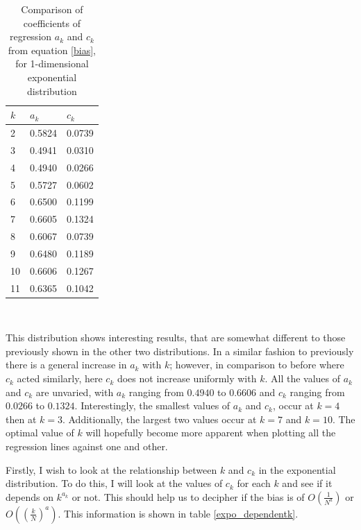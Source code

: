\documentclass[12pt]{report}
\begin{document}
\begin{table}
\caption{Comparison of coefficients of regression $a_{k}$ and $c_{k}$ from equation \ref{bias}, for 1-dimensional exponential distribution} \label{expo_a_c_compare_table}
\begin{center}
\begin{tabular}{| l | l l |} 
\toprule
$k$ &  $a_{k}$ & $c_{k}$ \\
\midrule[1pt]
2     & 0.5824    & 0.0739   \\
3     & 0.4941    & 0.0310   \\
4     & 0.4940    & 0.0266   \\
5     & 0.5727    & 0.0602   \\
6     & 0.6500    & 0.1199   \\
7     & 0.6605    & 0.1324   \\
8     & 0.6067    & 0.0739   \\
9     & 0.6480    & 0.1189   \\
10    & 0.6606    & 0.1267   \\
11    & 0.6365    & 0.1042   \\
\hline
\end{tabular}
\\[10pt]
\end{center}
\end{table}

This distribution shows interesting results, that are somewhat different to those previously shown in the other two distributions. In a similar fashion to previously there is a general increase in $a_{k}$ with $k$; however, in comparison to before where $c_{k}$ acted similarly, here $c_{k}$ does not increase uniformly with $k$. All the values of $a_{k}$ and $c_{k}$ are unvaried, with $a_{k}$ ranging from $0.4940$ to $0.6606$ and $c_{k}$ ranging from $0.0266$ to $0.1324$. Interestingly, the smallest values of $a_{k}$ and $c_{k}$, occur at $k=4$ then at $k=3$. Additionally, the largest two values occur at $k=7$ and $k=10$. The optimal value of $k$ will hopefully become more apparent when plotting all the regression lines against one and other.

Firstly, I wish to look at the relationship between $k$ and $c_{k}$ in the exponential distribution. To do this, I will look at the values of $c_{k}$ for each $k$ and see if it depends on $k^{a_{k}}$ or not. This should help us to decipher if the bias is of $O \left( \frac{1}{N^{a}} \right)$ or $O\left( \left( \frac{k}{N} \right)^{a} \right)$. This information is shown in table \ref{expo_dependentk}.
\end{document}
